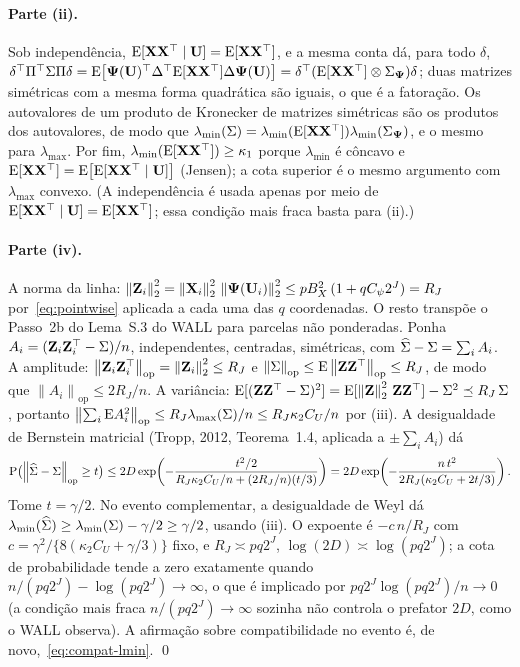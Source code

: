 \documentclass[11pt]{article}
\newcommand{\bPsi}{\boldsymbol{\Psi}}
\newcommand{\kron}{\otimes}
\newcommand{\lmin}{\lambda_{\min}}
\newcommand{\lmax}{\lambda_{\max}}
\newcommand{\opnorm}[1]{\left\lVert #1 \right\rVert_{\mathrm{op}}}
\begin{document}
\paragraph{Parte (ii).}
Sob independência, $\mathrm{E}[\mathbf{X}\mathbf{X}^{\top} \mid \mathbf{U}] = \mathrm{E}[\mathbf{X}\mathbf{X}^{\top}]$, e a mesma conta dá, para todo
$\delta$, $\delta\T\Pi\T\Gram\Pi\delta = \E\bigl[\bPsi(\bU)\T\Delta\T\E[\bX\bX\T]\Delta\bPsi(\bU)\bigr]
= \delta\T(\E[\bX\bX\T] \kron \Gram_{\bPsi})\delta$; duas matrizes simétricas com a mesma forma quadrática são
iguais, o que é a fatoração. Os autovalores de um produto de Kronecker de matrizes simétricas são os
produtos dos autovalores, de modo que $\lmin(\Gram) = \lmin(\E[\bX\bX\T])\lmin(\Gram_{\bPsi})$, e o mesmo para
$\lmax$. Por fim, $\lmin(\E[\bX\bX\T]) \ge \kappa_1$ porque $\lmin$ é côncavo e
$\mathrm{E}[\mathbf{X}\mathbf{X}^{\top}] = \mathrm{E}\bigl[\mathrm{E}[\mathbf{X}\mathbf{X}^{\top}\mid\mathbf{U}]\bigr]$ (Jensen); a cota superior é o mesmo argumento com
$\lmax$ convexo. (A independência é usada apenas por meio de $\mathrm{E}[\mathbf{X}\mathbf{X}^{\top} \mid \mathbf{U}] = \mathrm{E}[\mathbf{X}\mathbf{X}^{\top}]$; essa
condição mais fraca basta para (ii).)

\paragraph{Parte (iv).}
A norma da linha: $\norm{\bZ_i}_2^2 = \norm{\bX_i}_2^2\,\norm{\bPsi(\bU_i)}_2^2 \le pB_X^2\,(1 + qC_\psi 2^{J}) = R_J$
por~\eqref{eq:pointwise} aplicada a cada uma das $q$ coordenadas. O resto transpõe o Passo~2b do
Lema~S.3 do WALL para parcelas não ponderadas. Ponha $A_i = (\mathbf{Z}_i\mathbf{Z}_i^{\top} - \Sigma)/n$, independentes, centradas,
simétricas, com $\widehat{\Sigma} - \Sigma = \sum_i A_i$. A amplitude: $\opnorm{\bZ_i\bZ_i\T} = \norm{\bZ_i}_2^2 \le R_J$
e $\opnorm{\Gram} \le \E\opnorm{\bZ\bZ\T} \le R_J$, de modo que $\opnorm{A_i} \le 2R_J/n$. A variância:
$\mathrm{E}[(\mathbf{Z}\mathbf{Z}^{\top} - \Sigma)^2] = \mathrm{E}[\left\lVert \mathbf{Z} \right\rVert_2^2\,\mathbf{Z}\mathbf{Z}^{\top}] - \Sigma^2 \preceq R_J\,\Sigma$, portanto
$\opnorm{\sum_i \E A_i^2} \le R_J\lmax(\Gram)/n \le R_J\kappa_2 C_U/n$ por (iii). A desigualdade de Bernstein
matricial (Tropp, 2012, Teorema~1.4, aplicada a $\pm\sum_i A_i$) dá
\[
    \Prob\bigl(\opnorm{\Gramhat - \Gram} \ge t\bigr)
    \le 2D\exp\!\left( - \frac{t^2/2}{R_J\kappa_2 C_U/n + (2R_J/n)(t/3)} \right)
    = 2D\exp\!\left( - \frac{n\,t^2}{2R_J(\kappa_2 C_U + 2t/3)} \right) .
\]
Tome $t = \gamma/2$. No evento complementar, a desigualdade de Weyl dá
$\lmin(\Gramhat) \ge \lmin(\Gram) - \gamma/2 \ge \gamma/2$, usando (iii). O expoente é
$-c\,n/R_J$ com $c = \gamma^2/\{8(\kappa_2C_U + \gamma/3)\}$ fixo, e $R_J \asymp pq2^{J}$,
$\log(2D) \asymp \log(pq2^{J})$; a cota de probabilidade tende a zero exatamente quando
$n/(pq2^{J}) - \log(pq2^{J}) \to \infty$, o que é implicado por $pq2^{J}\log(pq2^{J})/n \to 0$ (a
condição mais fraca $n/(pq2^J) \to \infty$ sozinha não controla o prefator $2D$, como o WALL observa). A
afirmação sobre compatibilidade no evento é, de novo,~\eqref{eq:compat-lmin}. \qed
\end{document}
